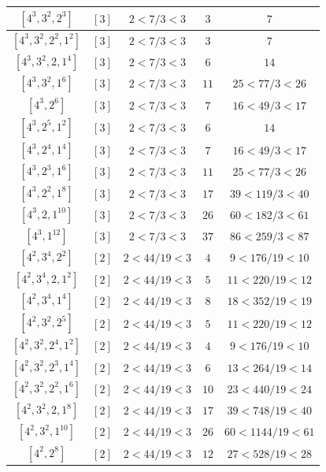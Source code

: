 \documentclass{article}%
\begin{document}
\begin{center}
\begin{longtable}{||c|c|c|c|c||}
$[4^{3}, 3^{2}, 2^{3}]$ & $[3]$ & $2 < 7/3 < 3$ & $3$ & $7$ \\ \hline 
$[4^{3}, 3^{2}, 2^{2}, 1^{2}]$ & $[3]$ & $2 < 7/3 < 3$ & $3$ & $7$ \\ \hline 
$[4^{3}, 3^{2}, 2, 1^{4}]$ & $[3]$ & $2 < 7/3 < 3$ & $6$ & $14$ \\ \hline 
$[4^{3}, 3^{2}, 1^{6}]$ & $[3]$ & $2 < 7/3 < 3$ & $11$ & $25 < 77/3 < 26$ \\ \hline 
$[4^{3}, 2^{6}]$ & $[3]$ & $2 < 7/3 < 3$ & $7$ & $16 < 49/3 < 17$ \\ \hline 
$[4^{3}, 2^{5}, 1^{2}]$ & $[3]$ & $2 < 7/3 < 3$ & $6$ & $14$ \\ \hline 
$[4^{3}, 2^{4}, 1^{4}]$ & $[3]$ & $2 < 7/3 < 3$ & $7$ & $16 < 49/3 < 17$ \\ \hline 
$[4^{3}, 2^{3}, 1^{6}]$ & $[3]$ & $2 < 7/3 < 3$ & $11$ & $25 < 77/3 < 26$ \\ \hline 
$[4^{3}, 2^{2}, 1^{8}]$ & $[3]$ & $2 < 7/3 < 3$ & $17$ & $39 < 119/3 < 40$ \\ \hline 
$[4^{3}, 2, 1^{10}]$ & $[3]$ & $2 < 7/3 < 3$ & $26$ & $60 < 182/3 < 61$ \\ \hline 
$[4^{3}, 1^{12}]$ & $[3]$ & $2 < 7/3 < 3$ & $37$ & $86 < 259/3 < 87$ \\ \hline 
$[4^{2}, 3^{4}, 2^{2}]$ & $[2]$ & $2 < 44/19 < 3$ & $4$ & $9 < 176/19 < 10$ \\ \hline 
$[4^{2}, 3^{4}, 2, 1^{2}]$ & $[2]$ & $2 < 44/19 < 3$ & $5$ & $11 < 220/19 < 12$ \\ \hline 
$[4^{2}, 3^{4}, 1^{4}]$ & $[2]$ & $2 < 44/19 < 3$ & $8$ & $18 < 352/19 < 19$ \\ \hline 
$[4^{2}, 3^{2}, 2^{5}]$ & $[2]$ & $2 < 44/19 < 3$ & $5$ & $11 < 220/19 < 12$ \\ \hline 
$[4^{2}, 3^{2}, 2^{4}, 1^{2}]$ & $[2]$ & $2 < 44/19 < 3$ & $4$ & $9 < 176/19 < 10$ \\ \hline 
$[4^{2}, 3^{2}, 2^{3}, 1^{4}]$ & $[2]$ & $2 < 44/19 < 3$ & $6$ & $13 < 264/19 < 14$ \\ \hline 
$[4^{2}, 3^{2}, 2^{2}, 1^{6}]$ & $[2]$ & $2 < 44/19 < 3$ & $10$ & $23 < 440/19 < 24$ \\ \hline 
$[4^{2}, 3^{2}, 2, 1^{8}]$ & $[2]$ & $2 < 44/19 < 3$ & $17$ & $39 < 748/19 < 40$ \\ \hline 
$[4^{2}, 3^{2}, 1^{10}]$ & $[2]$ & $2 < 44/19 < 3$ & $26$ & $60 < 1144/19 < 61$ \\ \hline 
$[4^{2}, 2^{8}]$ & $[2]$ & $2 < 44/19 < 3$ & $12$ & $27 < 528/19 < 28$ \\ \hline 

\end{longtable}
\end{center}
\end{document}
